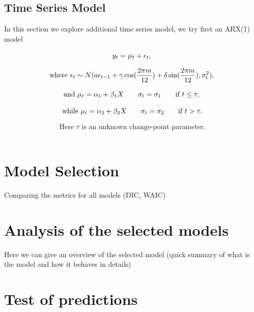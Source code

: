 \documentclass[12pt, titlepage]{article}
\begin{document}
\subsection{Time Series Model}
In this section we explore additional time series model, we try first an ARX(1) model

\begin{displaymath}
 y_t = \mu_t + \epsilon_t, \\ 
\end{displaymath}

\begin{displaymath}
 \text{where } \epsilon_t \sim {N}(a\epsilon_{t-1}+\gamma \cos(\frac{2\pi m}{12}) + \delta \sin(\frac{2\pi m}{12}),\sigma_t^2), \\
\end{displaymath}

\begin{displaymath}
 \text{and }  \mu_t = \alpha_1+\beta_1 X \qquad \sigma_t = \sigma_1 \qquad \text{if } t \leq \tau, \\
\end{displaymath}

\begin{displaymath}
 \text{while } \mu_t = \alpha_2+\beta_2 X \qquad \sigma_t = \sigma_2 \qquad \text{if } t > \tau.\\
\end{displaymath}

\begin{displaymath}
 \text{Here } \tau \text{ is an unknown change-point parameter.}
\end{displaymath}\\


\section{Model Selection}

Comparing the metrics for all models (DIC, WAIC)
\section{Analysis of the selected models}

Here we can give an overview of the selected model (quick summary of what is the model and how it behaves in details)
\section{Test of predictions}
\end{document}
